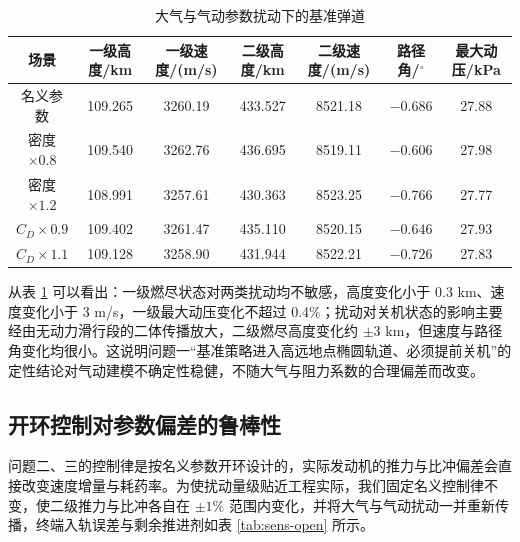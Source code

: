 \documentclass[withoutpreface,bwprint]{cumcmthesis}
\begin{document}
\begin{table}[!htbp]
\caption{大气与气动参数扰动下的基准弹道}
\label{tab:sens-atmo}
\centering
\small
\begin{tabular}{c|c|c|c|c|c|c}
\toprule[1.5pt]
场景 & 一级高度/km & 一级速度/(m/s) & 二级高度/km & 二级速度/(m/s) & 路径角/$^\circ$ & 最大动压/kPa \\
\midrule[1pt]
名义参数 & 109.265 & 3260.19 & 433.527 & 8521.18 & $-0.686$ & 27.88 \\
密度 $\times0.8$ & 109.540 & 3262.76 & 436.695 & 8519.11 & $-0.606$ & 27.98 \\
密度 $\times1.2$ & 108.991 & 3257.61 & 430.363 & 8523.25 & $-0.766$ & 27.77 \\
$C_D\times0.9$ & 109.402 & 3261.47 & 435.110 & 8520.15 & $-0.646$ & 27.93 \\
$C_D\times1.1$ & 109.128 & 3258.90 & 431.944 & 8522.21 & $-0.726$ & 27.83 \\
\bottomrule[1.5pt]
\end{tabular}
\end{table}

从表 \ref{tab:sens-atmo} 可以看出：一级燃尽状态对两类扰动均不敏感，高度变化小于 0.3 km、速度变化小于 3 m/s，一级最大动压变化不超过 0.4\%；扰动对关机状态的影响主要经由无动力滑行段的二体传播放大，二级燃尽高度变化约 $\pm3$ km，但速度与路径角变化均很小。这说明问题一“基准策略进入高远地点椭圆轨道、必须提前关机”的定性结论对气动建模不确定性稳健，不随大气与阻力系数的合理偏差而改变。

\subsection{开环控制对参数偏差的鲁棒性}
问题二、三的控制律是按名义参数开环设计的，实际发动机的推力与比冲偏差会直接改变速度增量与耗药率。为使扰动量级贴近工程实际，我们固定名义控制律不变，使二级推力与比冲各自在 $\pm1\%$ 范围内变化，并将大气与气动扰动一并重新传播，终端入轨误差与剩余推进剂如表 \ref{tab:sens-open} 所示。
\end{document}
